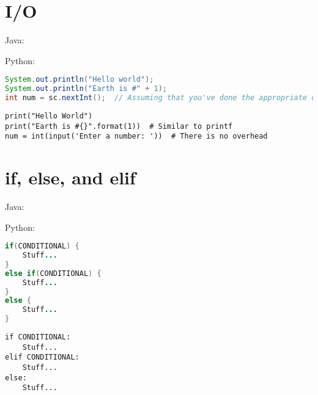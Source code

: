 \documentclass{article}
\begin{document}
\section{I/O}
\begin{minipage}{0.45\linewidth}
    Java:
\end{minipage}
\hfill
\begin{minipage}{0.45\linewidth}
    Python:
\end{minipage}

\begin{minipage}{0.45\linewidth}
    \begin{lstlisting}[language=Java]
System.out.println("Hello world");
System.out.println("Earth is #" + 1);
int num = sc.nextInt();  // Assuming that you've done the appropriate overhead
    \end{lstlisting}
\end{minipage}
\hfill
\begin{minipage}{0.45\linewidth}
    \begin{lstlisting}
print("Hello World")
print("Earth is #{}".format(1))  # Similar to printf
num = int(input('Enter a number: '))  # There is no overhead
    \end{lstlisting}
\end{minipage}

\section{if, else, and elif}
\begin{minipage}{0.45\linewidth}
    Java:
\end{minipage}
\hfill
\begin{minipage}{0.45\linewidth}
    Python:
\end{minipage}

\begin{minipage}{0.45\linewidth}
    \begin{lstlisting}[language=Java]
if(CONDITIONAL) {
    Stuff...
}
else if(CONDITIONAL) {
    Stuff...
}
else {
    Stuff...
}
    \end{lstlisting}
\end{minipage}
\hfill
\begin{minipage}{0.45\linewidth}
    \begin{lstlisting}
if CONDITIONAL:
    Stuff...
elif CONDITIONAL:
    Stuff...
else:
    Stuff...
    \end{lstlisting}
\end{minipage}
\end{document}
